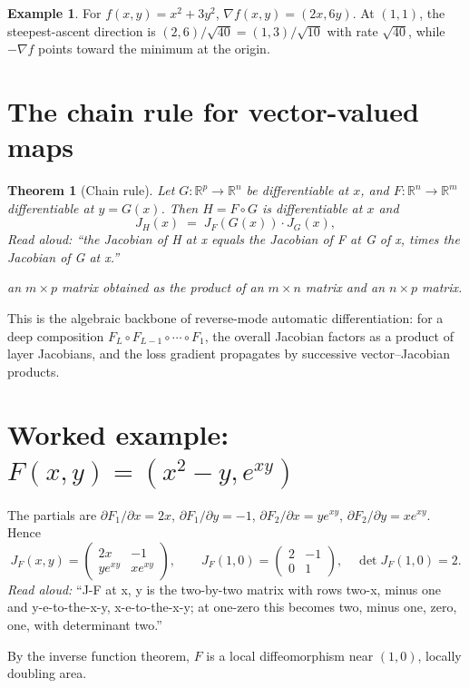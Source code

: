 \documentclass[11pt]{article}
\newtheorem{theorem}{Theorem}
\theoremstyle{definition}
\newtheorem{example}{Example}
\begin{document}
\begin{example}
For $f(x, y) = x^2 + 3y^2$, $\nabla f(x, y) = (2x, 6y)$. At $(1, 1)$,
the steepest-ascent direction is $(2, 6)/\sqrt{40} = (1, 3)/\sqrt{10}$
with rate $\sqrt{40}$, while $-\nabla f$ points toward the minimum at
the origin.
\end{example}

\section{The chain rule for vector-valued maps}

\begin{theorem}[Chain rule]
Let $G : \mathbb{R}^p \to \mathbb{R}^n$ be differentiable at $x$, and
$F : \mathbb{R}^n \to \mathbb{R}^m$ differentiable at $y = G(x)$.
Then $H = F \circ G$ is differentiable at $x$ and
\[
J_H(x) \;=\; J_F(G(x)) \cdot J_G(x),
\]
\emph{Read aloud:} ``the Jacobian of H at x equals the Jacobian of F at G of x, times the Jacobian of G at x.''

an $m \times p$ matrix obtained as the product of an $m \times n$ matrix
and an $n \times p$ matrix.
\end{theorem}

This is the algebraic backbone of reverse-mode automatic differentiation:
for a deep composition $F_L \circ F_{L-1} \circ \cdots \circ F_1$, the
overall Jacobian factors as a product of layer Jacobians, and the loss
gradient propagates by successive vector--Jacobian products.

\section{Worked example: $F(x, y) = (x^2 - y, e^{xy})$}

The partials are $\partial F_1/\partial x = 2x$, $\partial F_1/\partial y = -1$,
$\partial F_2/\partial x = y e^{xy}$, $\partial F_2/\partial y = x e^{xy}$.
Hence
\[
J_F(x, y) = \begin{pmatrix} 2x & -1 \\ y e^{xy} & x e^{xy} \end{pmatrix},
\qquad
J_F(1, 0) = \begin{pmatrix} 2 & -1 \\ 0 & 1 \end{pmatrix},
\quad \det J_F(1, 0) = 2.
\]
\emph{Read aloud:} ``J-F at x, y is the two-by-two matrix with rows two-x, minus one and y-e-to-the-x-y, x-e-to-the-x-y; at one-zero this becomes two, minus one, zero, one, with determinant two.''

By the inverse function theorem, $F$ is a local diffeomorphism near $(1, 0)$,
locally doubling area.
\end{document}
